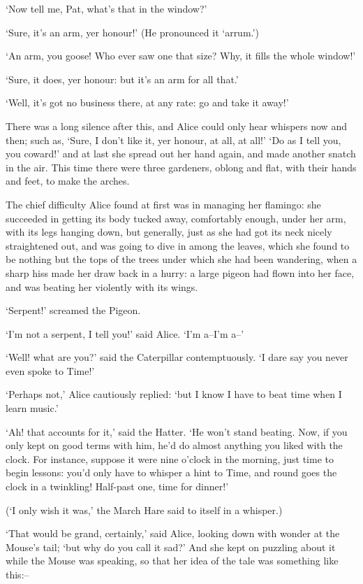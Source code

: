 \documentclass[statementpaper,twoside,openany]{memoir}
\begin{document}
`Now tell me, Pat, what's that in the window?'

`Sure, it's an arm, yer honour!' (He pronounced it `arrum.')

`An arm, you goose! Who ever saw one that size? Why, it fills the whole window!'

`Sure, it does, yer honour: but it's an arm for all that.'

`Well, it's got no business there, at any rate: go and take it away!'

There was a long silence after this, and Alice could only hear whispers now and then; such as, `Sure, I don't like it, yer honour, at all, at all!' `Do as I tell you, you coward!' and at last she spread out her hand again, and made another snatch in the air. This time there were three gardeners, oblong and flat, with their hands and feet, to make the arches.

The chief difficulty Alice found at first was in managing her flamingo: she succeeded in getting its body tucked away, comfortably enough, under her arm, with its legs hanging down, but generally, just as she had got its neck nicely straightened out, and was going to dive in among the leaves, which she found to be nothing but the tops of the trees under which she had been wandering, when a sharp hiss made her draw back in a hurry: a large pigeon had flown into her face, and was beating her violently with its wings.

`Serpent!' screamed the Pigeon.

`I'm not a serpent, I tell you!' said Alice. `I'm a--I'm a--'

`Well! what are you?' said the Caterpillar contemptuously. `I dare say you never even spoke to Time!'

`Perhaps not,' Alice cautiously replied: `but I know I have to beat time when I learn music.'

`Ah! that accounts for it,' said the Hatter. `He won't stand beating. Now, if you only kept on good terms with him, he'd do almost anything you liked with the clock. For instance, suppose it were nine o'clock in the morning, just time to begin lessons: you'd only have to whisper a hint to Time, and round goes the clock in a twinkling! Half-past one, time for dinner!'

(`I only wish it was,' the March Hare said to itself in a whisper.)

`That would be grand, certainly,' said Alice, looking down with wonder at the Mouse's tail; `but why do you call it sad?' And she kept on puzzling about it while the Mouse was speaking, so that her idea of the tale was something like this:--
\end{document}
